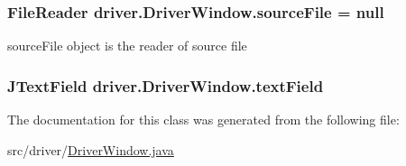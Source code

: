 \subsubsection[{\texorpdfstring{source\+File}{sourceFile}}]{\setlength{\rightskip}{0pt plus 5cm}File\+Reader driver.\+Driver\+Window.\+source\+File = null}\hypertarget{classdriver_1_1DriverWindow_a463a3d013ea4e8f95c818b2f7a7842d0}{}\label{classdriver_1_1DriverWindow_a463a3d013ea4e8f95c818b2f7a7842d0}


source\+File object is the reader of source file 

\subsubsection[{\texorpdfstring{text\+Field}{textField}}]{\setlength{\rightskip}{0pt plus 5cm}J\+Text\+Field driver.\+Driver\+Window.\+text\+Field\hspace{0.3cm}{\ttfamily [private]}}\hypertarget{classdriver_1_1DriverWindow_a28cd643f483a25f1793d57daae2813b1}{}\label{classdriver_1_1DriverWindow_a28cd643f483a25f1793d57daae2813b1}


The documentation for this class was generated from the following file\+:\begin{DoxyCompactItemize}
\item 
src/driver/\hyperlink{DriverWindow_8java}{Driver\+Window.\+java}\end{DoxyCompactItemize}
